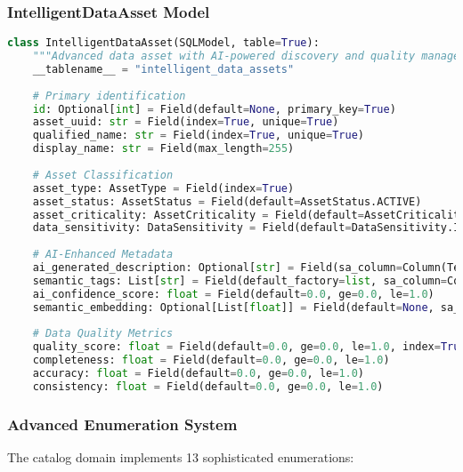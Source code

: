 \subsubsection{IntelligentDataAsset Model}
\begin{lstlisting}[language=Python, caption=IntelligentDataAsset Core Structure]
class IntelligentDataAsset(SQLModel, table=True):
    """Advanced data asset with AI-powered discovery and quality management"""
    __tablename__ = "intelligent_data_assets"
    
    # Primary identification
    id: Optional[int] = Field(default=None, primary_key=True)
    asset_uuid: str = Field(index=True, unique=True)
    qualified_name: str = Field(index=True, unique=True)
    display_name: str = Field(max_length=255)
    
    # Asset Classification
    asset_type: AssetType = Field(index=True)
    asset_status: AssetStatus = Field(default=AssetStatus.ACTIVE)
    asset_criticality: AssetCriticality = Field(default=AssetCriticality.MEDIUM)
    data_sensitivity: DataSensitivity = Field(default=DataSensitivity.INTERNAL)
    
    # AI-Enhanced Metadata
    ai_generated_description: Optional[str] = Field(sa_column=Column(Text))
    semantic_tags: List[str] = Field(default_factory=list, sa_column=Column(JSON))
    ai_confidence_score: float = Field(default=0.0, ge=0.0, le=1.0)
    semantic_embedding: Optional[List[float]] = Field(default=None, sa_column=Column(JSON))
    
    # Data Quality Metrics
    quality_score: float = Field(default=0.0, ge=0.0, le=1.0, index=True)
    completeness: float = Field(default=0.0, ge=0.0, le=1.0)
    accuracy: float = Field(default=0.0, ge=0.0, le=1.0)
    consistency: float = Field(default=0.0, ge=0.0, le=1.0)
\end{lstlisting}

\subsubsection{Advanced Enumeration System}

The catalog domain implements 13 sophisticated enumerations:

